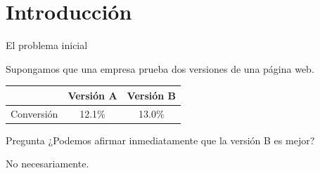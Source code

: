 \documentclass[aspectratio=169,11pt]{beamer}
\begin{document}
\section{Introducción}

\begin{frame}{El problema inicial}

Supongamos que una empresa prueba dos versiones de una página web.

\vspace{0.3cm}

\begin{center}

\begin{tabular}{lcc}
\toprule

&
\textbf{Versión A}
&
\textbf{Versión B} \\

\midrule

Conversión &
12.1\% &
13.0\% \\

\bottomrule
\end{tabular}

\end{center}

\vspace{0.5cm}

\begin{alertblock}{Pregunta}
¿Podemos afirmar inmediatamente que la versión B es mejor?
\end{alertblock}

\vspace{0.3cm}

No necesariamente.

\end{frame}

\end{document}
